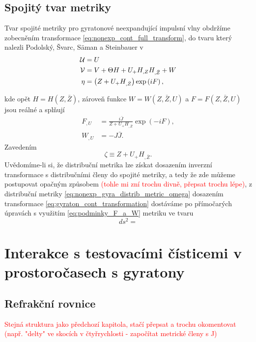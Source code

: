\subsection{Spojitý tvar metriky}
Tvar spojité metriky pro gyratonové neexpandující impulsní vlny obdržíme zobecněním transformace \eqref{eq:nonexp_cont_full_transform},
do tvaru který nalezli Podolský, Švarc, Säman a Steinbauer v \cite{Podolsky_2017}
\begin{equation}
    \label{eq:gyraton_cont_transformation}
    \begin{split}
        \mathcal{U} &= U \\
        \mathcal{V} &= V + \Theta H + U_{+} H_{,Z} H_{,\bar{Z}} + W \\
        \eta &= \left(Z + U_{+} H_{,\bar{Z}}\right) \exp \left(i F \right),
    \end{split}
\end{equation}

kde opět $H = H(Z, \bar{Z})$, zároveň funkce $W = W(Z, \bar{Z}, U)$ a $F = F(Z, \bar{Z}, U)$ jsou reálné a splňují
\begin{equation}
    \label{eq:podminky_F_a_W}
    \begin{split}
        F_{,U} &= \frac{i\bar{J}}{Z + U_{+}H_{,\bar{Z}}} \exp{\left(-iF\right)}, \\
        W_{,U} &= -J \bar{J}.
    \end{split}
\end{equation}
Zavedením
\begin{equation}
    \zeta \equiv Z + U_{+} H_{,\bar{Z}}.
\end{equation}
Uvědomíme-li si, že distribuční metrika lze získat dosazením inverzní transformace s distribučními členy do spojité metriky,
a tedy že zde můžeme postupovat opačným způsobem \textcolor{red}{(tohle mi zní trochu divně, přepsat trochu lépe)}, z distribuční metriky \eqref{eq:nonexp_gyra_distrib_metric_omega} dosazením transformace
\eqref{eq:gyraton_cont_transformation} dostáváme po přímočarých úpravách s využitím \eqref{eq:podminky_F_a_W} metriku ve tvaru
\begin{equation}
    \label{eq:spojita_gyratonova_metrika}
    ds^2 = 
\end{equation}


\section{Interakce s testovacími čísticemi v prostoročasech s gyratony}
\subsection{Refrakční rovnice}
\textcolor{red}{Stejná struktura jako předchozí kapitola, stačí přepsat a trochu okomentovat
(např. "delty" ve skocích v čtyřrychlosti - započítat metrické členy s J)}